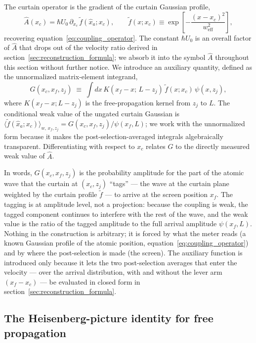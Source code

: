 \documentclass[11pt,a4paper]{article}
\newcommand{\weakvalps}[2]{\langle #1 \rangle_{w,\,#2}}
\begin{document}
The curtain operator is the gradient of the curtain Gaussian profile,
\begin{equation}
\hat{A}(x_c) = \hbar U_0\,\partial_{x_c}\,\tilde{f}(\hat{x}_a; x_c),
\qquad
\tilde{f}(x; x_c) \equiv \exp\!\left[-\frac{(x-x_c)^2}{w_\text{eff}^2}\right],
\label{eq:A_is_dxc_f}
\end{equation}
recovering equation~\eqref{eq:coupling_operator}. The constant $\hbar U_0$ is an overall factor of $\hat{A}$ that drops out of the velocity ratio derived in section~\ref{sec:reconstruction_formula}; we absorb it into the symbol $\hat{A}$ throughout this section without further notice. We introduce an auxiliary quantity, defined as the unnormalized matrix-element integrand,
\begin{equation}
G(x_c, x_f, z_j) \;\equiv\; \int dx\,K(x_f - x;\,L - z_j)\,\tilde{f}(x; x_c)\,\psi(x, z_j),
\label{eq:G_def}
\end{equation}
where $K(x_f - x; L - z_j)$ is the free-propagation kernel from $z_j$ to $L$. The conditional weak value of the ungated curtain Gaussian is $\weakvalps{\tilde{f}(\hat{x}_a; x_c)}{x_f, z_j} = G(x_c, x_f, z_j)/\psi(x_f, L)$; we work with the unnormalized form because it makes the post-selection-averaged integrals algebraically transparent. Differentiating with respect to $x_c$ relates $G$ to the directly measured weak value of $\hat{A}$.

In words, $G(x_c, x_f, z_j)$ is the probability amplitude for the part of the atomic wave that the curtain at $(x_c, z_j)$ ``tags'' --- the wave at the curtain plane weighted by the curtain profile $\tilde{f}$ --- to arrive at the screen position $x_f$. The tagging is at amplitude level, not a projection: because the coupling is weak, the tagged component continues to interfere with the rest of the wave, and the weak value is the ratio of the tagged amplitude to the full arrival amplitude $\psi(x_f, L)$. Nothing in the construction is arbitrary; it is forced by what the meter reads (a known Gaussian profile of the atomic position, equation~\eqref{eq:coupling_operator}) and by where the post-selection is made (the screen). The auxiliary function is introduced only because it lets the two post-selection averages that enter the velocity --- over the arrival distribution, with and without the lever arm $(x_f - x_c)$ --- be evaluated in closed form in section~\ref{sec:reconstruction_formula}.

\subsection{The Heisenberg-picture identity for free propagation}
\end{document}
